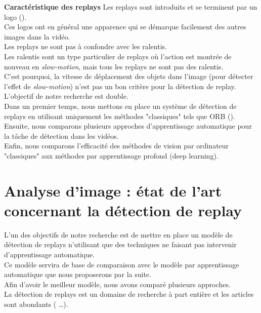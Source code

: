 \documentclass[11pt]{article}
\begin{document}
\textbf{Caractéristique des replays} Les replays sont introduits et se terminent par un logo (\cite{Hao_Pan_2002}).\\
Ces logos ont en général une apparence qui se démarque facilement des autres images dans la vidéo.\\
Les replays ne sont pas à confondre avec les ralentis.\\
Les ralentis sont un type particulier de replays où l'action est montrée de nouveau en \emph{slow-motion}, mais tous les replays ne sont pas des ralentis.\\
C'est pourquoi, la vitesse de déplacement des objets dans l'image (pour détecter l'effet de \emph{slow-motion}) n'est pas un bon critère pour la détection de replay.\\

L'objectif de notre recherche est double.\\
Dans un premier temps, nous mettons en place un système de détection de replays en utilisant uniquement les méthodes "classiques" tels que ORB (\cite{Rublee_2011}).\\
Ensuite, nous comparons plusieurs approches d'apprentissage automatique pour la tâche de détection dans les vidéos.\\
Enfin, nous comparons l'efficacité des méthodes de vision par ordinateur "classiques" aux méthodes par apprentissage profond (deep learning).\\

\newpage
\section{Analyse d'image : état de l'art concernant la détection de replay}
\label{sec:orgc725620}
L'un des objectifs de notre recherche est de mettre en place un modèle de détection de replays n'utilisant que des techniques ne faisant pas intervenir d'apprentissage automatique.\\
Ce modèle servira de base de comparaison avec le modèle par apprentissage automatique que nous proposerons par la suite.\\
Afin d'avoir le meilleur modèle, nous avons comparé plusieurs approches.\\

La détection de replays est un domaine de recherche à part entière et les articles sont abondants (\cite{Hao_Pan_2002,Ling_Yu_Duan,Chu_2015,Javed_2019} \ldots{}).\\
\end{document}
